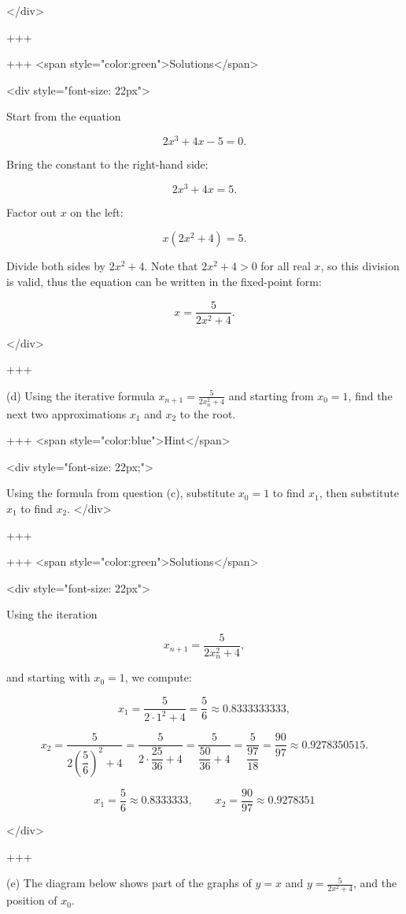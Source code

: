 </div>

+++

+++ <span style="color:green">Solutions</span>

<div style="font-size: 22px">

Start from the equation

$$
2x^{3}+4x-5=0.
$$

Bring the constant to the right-hand side:

$$
2x^{3}+4x=5.
$$

Factor out $x$ on the left:

$$
x(2x^{2}+4)=5.
$$

Divide both sides by $2x^{2}+4$. Note that $2x^{2}+4>0$ for all real $x$, so this division is valid, thus the equation can be written in the fixed-point form:

$$
x=\frac{5}{2x^{2}+4}.
$$

</div>

+++

(d) Using the iterative formula $x_{n+1}=\frac{5}{2 x_{n}^{2}+4}$ and starting from $x_{0}=1$, find the next two approximations $x_{1}$ and $x_{2}$ to the root.

+++ <span style="color:blue">Hint</span>

<div style="font-size: 22px;">

Using the formula from question (c), substitute $x_0=1$ to find $x_1$, then substitute $x_1$ to find $x_2$.
</div>

+++

+++ <span style="color:green">Solutions</span>

<div style="font-size: 22px">

Using the iteration

$$
x_{n+1}=\frac{5}{2x_{n}^{2}+4},
$$

and starting with $x_0=1$, we compute:


$$
x_1=\frac{5}{2\cdot 1^{2}+4}=\frac{5}{6}\approx 0.8333333333,
$$



$$
x_2=\frac{5}{2\left(\dfrac{5}{6}\right)^{2}+4}
=\frac{5}{2\cdot \dfrac{25}{36}+4}
=\frac{5}{\dfrac{50}{36}+4}
=\frac{5}{\dfrac{97}{18}}
=\frac{90}{97}\approx 0.9278350515.
$$



$$
x_1=\frac{5}{6}\approx 0.8333333,\qquad x_2=\frac{90}{97}\approx 0.9278351
$$


</div>

+++

(e) The diagram below shows part of the graphs of $y=x$ and $y=\frac{5}{2 x^{2}+4}$, and the position of $x_{0}$.

